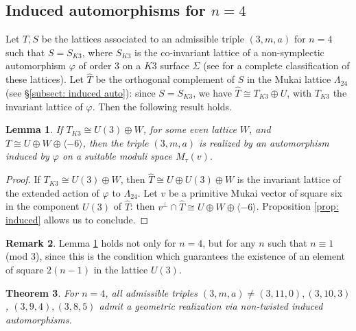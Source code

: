 \documentclass{amsart}
\newtheorem{theorem}{Theorem}[section]
\newtheorem{lemma}[theorem]{Lemma}
\theoremstyle{definition}
\newtheorem{rem}[theorem]{Remark}
\begin{document}
\subsection{Induced automorphisms for $n=4$} \label{subsection: induced autom n=4}

Let $T,S$  be the lattices associated to an admissible triple $(3,m,a)$ for $n=4$ such that $S = S_{K3}$, where $S_{K3}$ is the co-invariant lattice of a non-symplectic automorphism $\varphi$ of order $3$ on a $K3$ surface $\Sigma$ (see \cite{autom_k3_ord3} for a complete classification of these lattices). Let $\hat{T}$ be the orthogonal complement of $S$ in the Mukai lattice $\Lambda_{24}$ (see \S \ref{subsect: induced auto}): since $S = S_{K3}$, we have $\hat{T} \cong T_{K3} \oplus U$, with $T_{K3}$ the invariant lattice of $\varphi$. Then the following result holds.

\begin{lemma} \label{lemma: induced n=4}
If $T_{K3} \cong U(3) \oplus W$, for some even lattice $W$, and $T \cong U \oplus W \oplus \langle -6 \rangle$, then the triple $(3,m,a)$ is realized by an automorphism induced by $\varphi$ on a suitable moduli space $M_{\tau}(v)$. 
\end{lemma}

\begin{proof}
If $T_{K3} \cong U(3) \oplus W$, then $\hat{T} \cong U \oplus U(3) \oplus W$ is the invariant lattice of the extended action of $\varphi$ to $\Lambda_{24}$. Let $v$ be a primitive Mukai vector of square six in the component $U(3)$ of $\hat{T}$: then $v^\perp \cap \hat{T} \cong U \oplus W \oplus \langle -6 \rangle$. Proposition \ref{prop: induced} allows us to conclude.
\end{proof}

\begin{rem}
Lemma \ref{lemma: induced n=4} holds not only for $n=4$, but for any $n$ such that $n \equiv 1$ (mod $3$), since this is the condition which guarantees the existence of an element of square $2(n-1)$ in the lattice $U(3)$.
\end{rem}

\begin{theorem}
For $n=4$, all admissible triples $(3,m,a) \neq (3,11,0), (3,10,3)$, $(3,9,4), (3,8,5)$ admit a geometric realization via non-twisted induced automorphisms.
\end{theorem}
\end{document}
